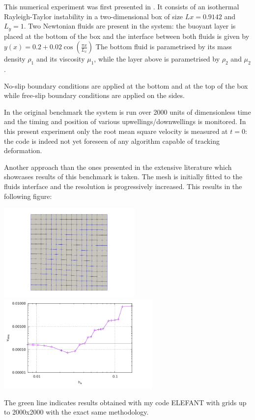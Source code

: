 

This numerical experiment was first presented in \cite{vaks97}.
It consists of an isothermal Rayleigh-Taylor instability in a two-dimensional box
of size $Lx=0.9142$ and $L_y=1$.
Two Newtonian fluids are present in the system: the buoyant layer is placed at the bottom of 
the box and the interface between both fluids is given by 
$
y(x)=0.2+0.02\cos \left( \frac{\pi x}{L_x}  \right)
$
The bottom fluid is parametrised by its mass density $\rho_1$ and its viscosity $\mu_1$, 
while the layer above is parametrised by $\rho_2$ and $\mu_2$.

No-slip boundary conditions are applied at the bottom and at the top of the box 
while free-slip boundary conditions are applied on the sides. 

In the original benchmark the system is run over 2000 units of dimensionless time and the 
timing and position of various upwellings/downwellings is monitored. 
In this present experiment only the root mean square velocity is measured at $t=0$:
the code is indeed not yet foreseen of any algorithm capable of tracking deformation.

Another approach than the ones presented in the extensive literature which showcases 
results of this benchmark is taken. The mesh is initially fitted to the fluids
interface and the resolution is progressively increased. This results in the 
following figure:

\begin{center}
\includegraphics[width=7cm]{python_codes/fieldstone_25/images/grid}
\includegraphics[width=8cm]{python_codes/fieldstone_25/images/vrms.pdf}
\end{center}
The green line indicates results obtained with my code ELEFANT with grids up to 2000x2000
with the exact same methodology.

